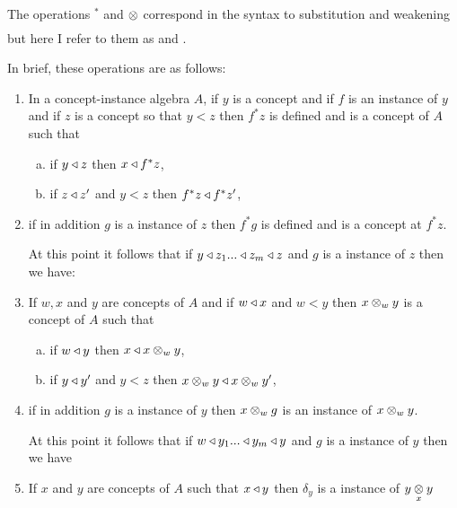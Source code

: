\documentclass[10pt,a4paper]{article}
\newcounter{levelofdetail}
\begin{document}
\vspace{1cm}
The  operations $^*$ and $\crossx{}{}{}$  
 correspond in the syntax to  substitution and  weakening but here I refer to them as  and 
 .

In brief, these operations are as follows:

\begin{enumerate}
\item In a concept-instance algebra $A$, if $y$ is a concept and if $f$ is an instance of $y$
 and if $z$ is a concept so that $y < z$ then $f^*z$ is defined and is a concept of $A$ 
      such that 
			\begin{enumerate}[(a)]
			\item if $y \base z$ then $x \base f^*z$,
			\item if $z \base z'$ and $y <z$ then $f^*z \base f^*z'$,
			\end{enumerate}
\setcounter{levelofdetail}{1} %

\item if in addition $g$ is a instance of $z$ then $f^*g$ is defined and is a concept at $f^*z$. 
\setcounter{levelofdetail}{3} %



At this point it follows that if $y \base z_1 ... \base z_m \base z$ and $g$ is a instance of $z$ then we have:

 

\item If $w,x$ and $y$ are concepts of $A$  and if $w \base x$ and $w < y$ then $x \cross_w y$ is a concept of $A$ 
such that
    \begin{enumerate}[(a)]
		\item if $w \base y$ then $x \base x \cross_w y$,
		\item if $y \base y'$ and $y <z$ then $x \cross_w y \base x \cross_w y'$,
		\end{enumerate}
\item if in addition $g$ is a instance of $y$ then $x \cross_w g$ is an instance of $x \cross_w y$.

At this point it follows that if $w \base y_1 ... \base y_m \base y$ and $g$ is a instance of $y$ then we have

\vspace{0.5cm}
\item If $x$ and $y$ are concepts of $A$ such that $x \base y$ then $\delta_y$ is a instance of $\crossx{y}{y}{x}$
\vspace{0.5cm}
 
\end{enumerate}
\end{document}
